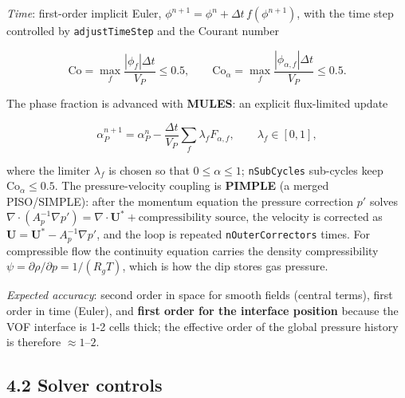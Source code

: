 \documentclass[11pt,english]{article}
\begin{document}
\emph{Time}: first-order implicit Euler,
\(\phi^{n+1}=\phi^n+\Delta t\,f(\phi^{n+1})\), with the time step
controlled by \texttt{adjustTimeStep} and the Courant number

\[
\mathrm{Co} = \max_f \frac{|\phi_f|\Delta t}{V_P} \le 0.5,\qquad
\mathrm{Co}_\alpha = \max_f \frac{|\phi_{\alpha,f}|\Delta t}{V_P} \le 0.5 .
\]

The phase fraction is advanced with \textbf{MULES}: an explicit
flux-limited update

\[
\alpha_P^{n+1} = \alpha_P^{n} - \frac{\Delta t}{V_P}\sum_f \lambda_f F_{\alpha,f},
\qquad \lambda_f \in [0,1],
\]

where the limiter \(\lambda_f\) is chosen so that \(0\le\alpha\le1\);
\texttt{nSubCycles} sub-cycles keep \(\mathrm{Co}_\alpha\le 0.5\). The
pressure-velocity coupling is \textbf{PIMPLE} (a merged PISO/SIMPLE):
after the momentum equation the pressure correction \(p'\) solves
\(\nabla\cdot\left(A_p^{-1}\nabla p'\right) = \nabla\cdot\mathbf U^* + \text{compressibility source}\),
the velocity is corrected as
\(\mathbf U=\mathbf U^* - A_p^{-1}\nabla p'\), and the loop is repeated
\texttt{nOuterCorrectors} times. For compressible flow the continuity
equation carries the density compressibility
\(\psi=\partial\rho/\partial p = 1/(R_gT)\), which is how the dip stores
gas pressure.

\emph{Expected accuracy}: second order in space for smooth fields
(central terms), first order in time (Euler), and \textbf{first order
for the interface position} because the VOF interface is 1-2 cells
thick; the effective order of the global pressure history is therefore
\(\approx 1\)--\(2\).

\subsection{4.2 Solver controls}\label{solver-controls}
\end{document}
